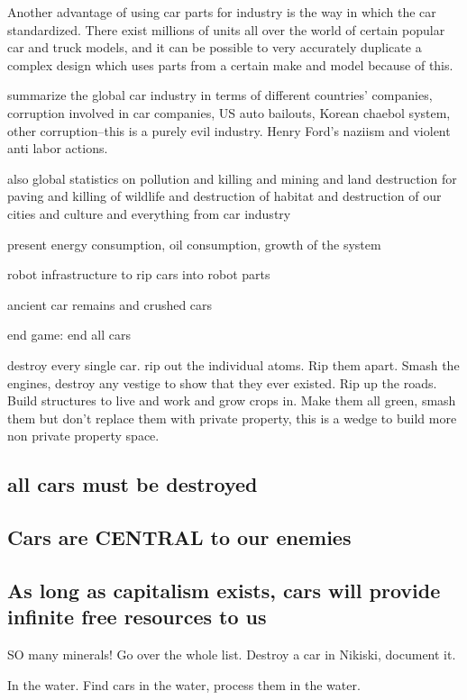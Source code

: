 Another advantage of using car parts for industry is the way in which
the car standardized. There exist millions of units all over the world
of certain popular car and truck models, and it can be possible to very
accurately duplicate a complex design which uses parts from a certain
make and model because of this.

summarize the global car industry in terms of different countries'
companies, corruption involved in car companies, US auto bailouts,
Korean chaebol system, other corruption--this is a purely evil industry.
Henry Ford's naziism and violent anti labor actions.

also global statistics on pollution and killing and mining and land
destruction for paving and killing of wildlife and destruction of
habitat and destruction of our cities and culture and everything from
car industry

present energy consumption, oil consumption, growth of the system

robot infrastructure to rip cars into robot parts

ancient car remains and crushed cars

end game: end all cars

destroy every single car. rip out the individual atoms. Rip them apart.
Smash the engines, destroy any vestige to show that they ever existed.
Rip up the roads. Build structures to live and work and grow crops in.
Make them all green, smash them but don't replace them with private
property, this is a wedge to build more non private property space.

\subsection{all cars must be
destroyed}\label{all-cars-must-be-destroyed}

\subsection{Cars are CENTRAL to our
enemies}\label{cars-are-central-to-our-enemies}

\subsection{As long as capitalism exists, cars will provide infinite
free resources to
us}\label{as-long-as-capitalism-exists-cars-will-provide-infinite-free-resources-to-us}

SO many minerals! Go over the whole list. Destroy a car in Nikiski,
document it.

In the water. Find cars in the water, process them in the water.
